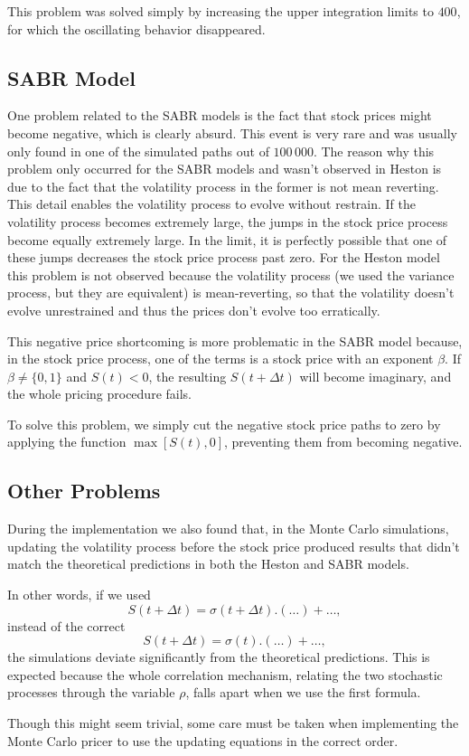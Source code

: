 This problem was solved simply by increasing the upper integration limits to $400$, for which the oscillating behavior disappeared.



\subsection{SABR Model}
One problem related to the SABR models is the fact that stock prices might become negative, which is clearly absurd. This event is very rare and was usually only found in one of the simulated paths out of $100\,000$.
The reason why this problem only occurred for the SABR models and wasn't observed in Heston is due to the fact that the volatility process in the former is not mean reverting.
This detail enables the volatility process to evolve without restrain. If the volatility process becomes extremely large, the jumps in the stock price process become equally extremely large. In the limit, it is perfectly possible that one of these jumps decreases the stock price process past zero. For the Heston model this problem is not observed because the volatility process (we used the variance process, but they are equivalent) is mean-reverting, so that the volatility doesn't evolve unrestrained and thus the prices don't evolve too erratically.

This negative price shortcoming is more problematic in the SABR model because, in the stock price process, one of the terms is a stock price with an exponent $\beta$. If $\beta\neq\{0,1\}$ and $S(t)<0$, the resulting $S(t+\Delta t)$ will become imaginary, and the whole pricing procedure fails.

To solve this problem, we simply cut the negative stock price paths to zero by applying the function $\max[S(t),0]$, preventing them from becoming negative.



\subsection{Other Problems}
During the implementation we also found that, in the Monte Carlo simulations, updating the volatility process before the stock price produced results that didn't match the theoretical predictions in both the Heston and SABR models.

In other words, if we used
\begin{equation}
S(t+\Delta t)=\sigma(t+\Delta t).\left(\ldots\right)+\ldots,
\end{equation}
instead of the correct
\begin{equation}
S(t+\Delta t)=\sigma(t).\left(\ldots\right)+\ldots,
\end{equation}
\noindent the simulations deviate significantly from the theoretical predictions.
This is expected because the whole correlation mechanism, relating the two stochastic processes through the variable $\rho$, falls apart when we use the first formula.

Though this might seem trivial, some care must be taken when implementing the Monte Carlo pricer to use the updating equations in the correct order.







